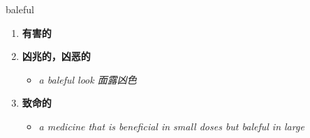 
\begin{frame}
{\huge baleful}
\begin{center}
\begin{enumerate}\Large
  \item \textbf{有害的}
  \item \textbf{凶兆的，凶恶的}
  \begin{itemize}
    \item \em{\Large{a baleful look 面露凶色}}
  \end{itemize}
  \item \textbf{致命的}
  \begin{itemize}
    \item \em{\Large{a medicine that is beneficial in small doses but baleful in large}}
  \end{itemize}
\end{enumerate}
\end{center}
\end{frame}
